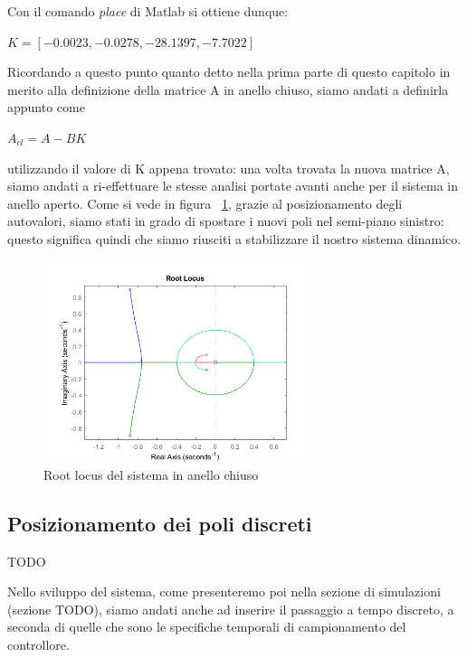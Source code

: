 Con il comando \textit{place} di Matlab si ottiene dunque:
\begin{center}
	
	$	K =[  -0.0023  , -0.0278, -28.1397  , -7.7022]$
	
\end{center}

Ricordando a questo punto quanto detto nella prima parte di questo capitolo in merito alla definizione della matrice A in anello chiuso, siamo andati a definirla appunto come

\begin{center}
	$
	A_{cl} =A-BK
	$
\end{center}

utilizzando il valore di K appena trovato: una volta trovata la nuova matrice A, siamo andati a ri-effettuare le stesse analisi portate avanti anche per il sistema in anello aperto.
Come si vede in figura ~\ref{fig:closed_loop_root}, grazie al posizionamento degli autovalori, siamo stati in grado di spostare i nuovi poli nel semi-piano sinistro: questo significa quindi che siamo riusciti a stabilizzare il nostro sistema dinamico.
\begin{figure}[H]
	\centering   	
	\includegraphics[width=0.7\textwidth]{Immagini/root_locus_closed_loop.png}
	\caption{Root locus del sistema in anello chiuso}
	\label{fig:closed_loop_root}
\end{figure}

\subsection{Posizionamento dei poli discreti}
TODO

Nello sviluppo del sistema, come presenteremo poi nella sezione di simulazioni (sezione TODO), siamo andati anche ad inserire il passaggio a tempo discreto, a seconda di quelle che sono le specifiche temporali di campionamento del controllore.

